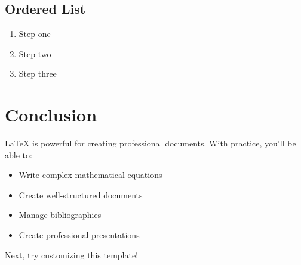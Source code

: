 \documentclass{article}
\begin{document}
\subsection{Ordered List}
\begin{enumerate}
    \item Step one
    \item Step two
    \item Step three
\end{enumerate}

\section{Conclusion}

\LaTeX{} is powerful for creating professional documents. With practice, you'll be able to:

\begin{itemize}
    \item Write complex mathematical equations
    \item Create well-structured documents
    \item Manage bibliographies
    \item Create professional presentations
\end{itemize}

Next, try customizing this template!
\end{document}
